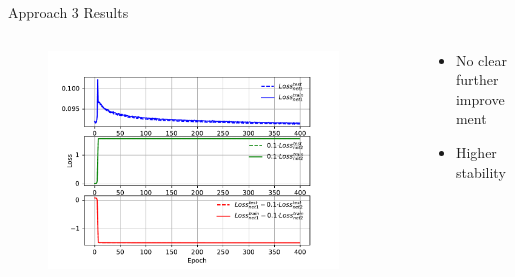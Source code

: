 \begin{frame}{Approach 3 Results}
\begin{figure}[htbp]
    \end{figure}
    \vspace{-0.9cm}
    \begin{columns}
    \begin{column}{0.5\textwidth}
    \begin{figure}
            \includegraphics[width=0.9\textwidth]{app3/app3_losses2.pdf}
    \end{figure}
    \end{column}
    \begin{column}{0.5\textwidth}
    \begin{itemize}
        \item No clear further improvement
        \item Higher stability
    \end{itemize}
    \end{column}
    \end{columns}
\end{frame}
